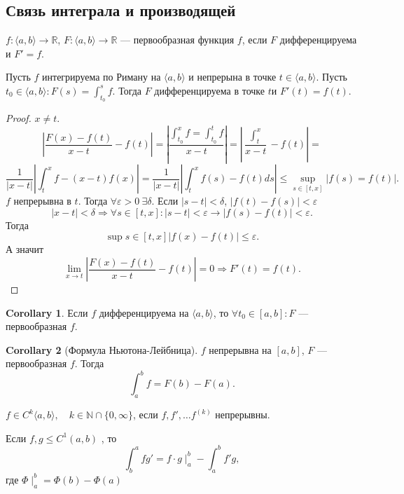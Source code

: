 \documentclass[11pt]{book}
\newcommand{\N}{\mathbb{N}}
\newcommand{\R}{\mathbb{R}}
\renewcommand{\le}{\leqslant}
\theoremstyle{definition}
\theoremstyle{plain}
\theoremstyle{plain}
\theoremstyle{definition}
\newtheorem*{cor}{Corollary}
\theoremstyle{remark}
\begin{document}
\subsection{Связь интеграла и производящей}
$ f : \langle a, b \rangle  \to  \R$, $ F: \langle a, b \rangle \to  \R$ --- первообразная функция $ f$, если $ F$   дифференцируема и $ F' = f$.
\begin{thm}
    Пусть $ f$ интегрируема по Риману на $ \langle a, b \rangle$ и непрерына в точке $ t \in  \langle a, b \rangle$. Пусть $ t_0 \in  \langle a, b \rangle: F(s) = \int_{t_0} ^{s} f$.
    Тогда $ F$   дифференцируема в точке $ t$и $ F'(t) = f(t)$.
\end{thm}
\begin{proof}
    $ x \ne t$.\[
	\left |	\frac{F(x) - f(t)}{x-t} - f(t) \right | = \left| \frac{\int_{t_0}^{x} f = \int_{t_0} ^{t} f}{x - t} \right| = \left| \frac{\int_t^{x}}{x - t} - f(t) \right|  =
    \]
    \[
	\frac{1}{|x-t|} \left| \int _t ^{ x} f - (x-t)f(x) \right|  = \frac{1}{|x-t|}\left |{\int_t ^{x} f(s) - f(t) ds } \right | \le  \sup_{s \in  [t, x] } |f(s) = f(t)|
    .\]
    $ f$   непрерывна в $ t$. Тогда $ \forall  \varepsilon  > 0 ~ \exists  \delta  $. Если $| s- t| < \delta$, $ |f(t) - f(s) |< \varepsilon $
    \[
	|x - t| < \delta  \Longrightarrow \forall s \in  [t, x]: |s - t| < \varepsilon  \to |f(s) - f(t) | < \varepsilon
    .\]
    Тогда \[
	\sup{s \in [t, x]} |f(x) - f(t)| \le  \varepsilon
    .\]
    А значит \[
	\lim_{x \to  t} |\frac{F(x) - f(t)}{x -t}- f(t)| = 0 \Longrightarrow F'(t) = f(t)
    .\]
\end{proof}
\begin{cor}
    Если $ f$ дифференцируема на $ \langle a, b \rangle$, то $ \forall t_0 \in  [a, b]: F $ ---первообразная $ f$.
\end{cor}
\begin{cor}[Формула Ньютона-Лейбница]
    $ f$   непрерывна на $ [a, b]$, $ F$ ---первообразная $ f$. Тогда \[
	\int_a^{b} f = F(b) - F(a)
    .\]
\end{cor}
\begin{defn}
    $ f \in  C^{k} \langle a, b \rangle, \quad k \in \N \cap  \{0,  \infty\}$, если $ f, f', \ldots f^{(k)} $   непрерывны.
\end{defn}
\begin{thm}
    Если $ f, g \le  C^{1} (a, b)$ , то
    \[
	\int _b ^{a} f g' = f \cdot g \mid _a ^{ b} - \int_a ^{ b} f' g
    ,\]
    где $ \Phi \mid _a ^{ b} = \Phi(b) - \Phi(a)$
\end{thm}
\end{document}
